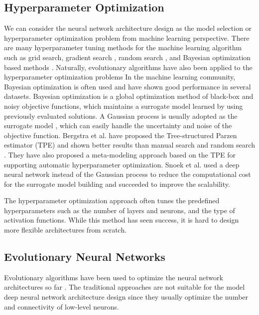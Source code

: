 \subsection{Hyperparameter Optimization}
We can consider the neural network architecture design as the model selection or hyperparameter optimization problem from machine learning perspective. There are many hyperparameter tuning methods for the machine learning algorithm such as grid search, gradient search \cite{bengio_gradient-based_2000}, random search \cite{bergstra_random_2012}, and Bayesian optimization based methods \cite{hutter_sequential_2011,snoek_practical_2012}. Naturally, evolutionary algorithms have also been applied to the hyperparameter optimization problems  In the machine learning community, Bayesian optimization is often used and have shown good performance in several datasets. Bayesian optimization is a global optimization method of black-box and noisy objective functions, which maintains a surrogate model learned by using previously evaluated solutions. A Gaussian process is usually adopted as the surrogate model \cite{snoek_practical_2012}, which can easily handle the uncertainty and noise of the objective function.
Bergstra et al. \cite{bergstra_algorithms_2011} have proposed the Tree-structured Parzen estimator (TPE) and shown better results than manual search and random search \cite{bergstra_random_2012}.
They have also proposed a meta-modeling approach \cite{bergstra_making_2013} based on the TPE for supporting automatic hyperparameter optimization. 
Snoek et al. \cite{snoek_scalable_2015} used a deep neural network instead of the Gaussian process to reduce the computational cost for the surrogate model building and succeeded to improve the scalability.

The hyperparameter optimization approach often tunes the predefined hyperparameters such as the number of layers and neurons, and the type of activation functions. While this method has seen success, it is hard to design more flexible architectures from scratch.

\subsection{Evolutionary Neural Networks}
Evolutionary algorithms have been used to optimize the neural network architectures so far \cite{schaffer_combinations_1992,stanley_evolving_2002}. The traditional approaches are not suitable for the model deep neural network architecture design since they usually optimize the number and connectivity of low-level neurons.

